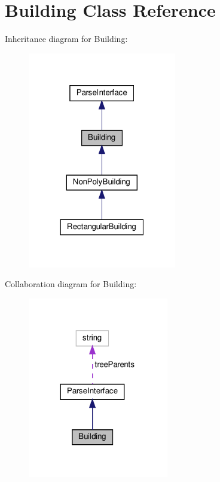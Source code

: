 \hypertarget{classBuilding}{}\section{Building Class Reference}
\label{classBuilding}


Inheritance diagram for Building\+:
\nopagebreak
\begin{figure}[H]
\begin{center}
\leavevmode
\includegraphics[width=184pt]{classBuilding__inherit__graph}
\end{center}
\end{figure}


Collaboration diagram for Building\+:
\nopagebreak
\begin{figure}[H]
\begin{center}
\leavevmode
\includegraphics[width=174pt]{classBuilding__coll__graph}
\end{center}
\end{figure}
